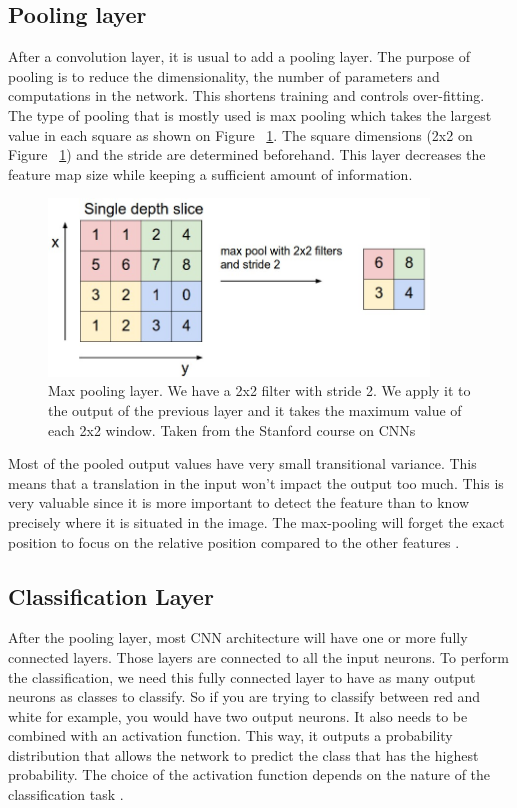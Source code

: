 \subsection{Pooling layer}
After a convolution layer, it is usual to add a pooling layer. The purpose of pooling is to reduce the dimensionality, the number of parameters and computations in the network. This shortens training and controls over-fitting.
The type of pooling that is mostly used is max pooling which takes the largest value in each square as shown on Figure ~\ref{fig:maxpool}. The square dimensions (2x2 on Figure ~\ref{fig:maxpool})  and the stride are determined beforehand. This layer decreases the feature map size while keeping a sufficient amount of information. 
	\begin{figure}[!htp]
    \centering
        \includegraphics[width=0.9\textwidth]{figures/02-maxpool}
        \caption[Max Pooling layer]{Max pooling layer. We have a 2x2 filter with stride 2. We apply it to the output of the previous layer and it takes the maximum value of each 2x2 window. Taken from the Stanford course on CNNs \cite{cs231n}}\label{fig:maxpool}
    \end{figure}
 
   
Most of the pooled output values have very small transitional variance. This means that a translation in the input won't impact the output too much. This is very valuable since it is more important to detect the feature than to know precisely where it is situated in the image. The max-pooling will forget the exact position to focus on the relative position compared to the other features \cite{cs231n}.

\subsection{Classification Layer}
\label{sec:class_lay}
After the pooling layer, most CNN architecture will have one or more fully connected layers. Those layers are connected to all the input neurons. To perform the classification, we need this fully connected layer to have as many output neurons as classes to classify. So if you are trying to classify between red and white for example, you would have two output neurons.  It also needs to be combined with an activation function. This way, it outputs a probability distribution that allows the network to predict the class that has the highest probability. The choice of the activation function depends on the nature of the classification task \cite{deepbook}.
